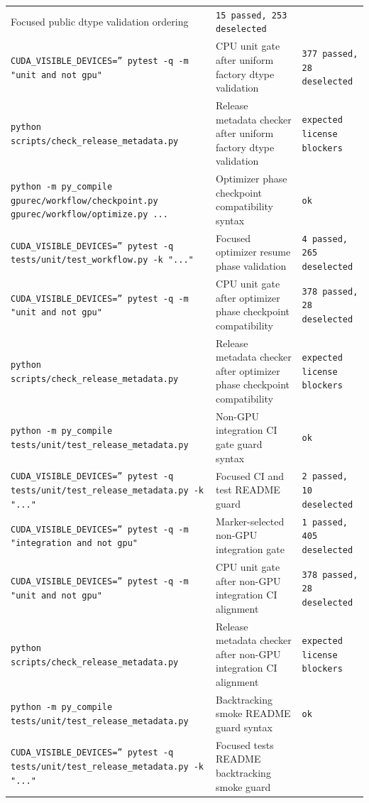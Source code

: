 \documentclass[11pt]{article}
\begin{document}
\begin{center}
\begin{tabular}{lll}
Focused public dtype validation ordering &
\texttt{15 passed, 253 deselected} \\
\texttt{CUDA\_VISIBLE\_DEVICES='' pytest -q -m "unit and not gpu"} &
CPU unit gate after uniform factory dtype validation &
\texttt{377 passed, 28 deselected} \\
\texttt{python scripts/check\_release\_metadata.py} &
Release metadata checker after uniform factory dtype validation &
\texttt{expected license blockers} \\
\texttt{python -m py\_compile gpurec/workflow/checkpoint.py gpurec/workflow/optimize.py ...} &
Optimizer phase checkpoint compatibility syntax &
\texttt{ok} \\
\texttt{CUDA\_VISIBLE\_DEVICES='' pytest -q tests/unit/test\_workflow.py -k "..."} &
Focused optimizer resume phase validation &
\texttt{4 passed, 265 deselected} \\
\texttt{CUDA\_VISIBLE\_DEVICES='' pytest -q -m "unit and not gpu"} &
CPU unit gate after optimizer phase checkpoint compatibility &
\texttt{378 passed, 28 deselected} \\
\texttt{python scripts/check\_release\_metadata.py} &
Release metadata checker after optimizer phase checkpoint compatibility &
\texttt{expected license blockers} \\
\texttt{python -m py\_compile tests/unit/test\_release\_metadata.py} &
Non-GPU integration CI gate guard syntax &
\texttt{ok} \\
\texttt{CUDA\_VISIBLE\_DEVICES='' pytest -q tests/unit/test\_release\_metadata.py -k "..."} &
Focused CI and test README guard &
\texttt{2 passed, 10 deselected} \\
\texttt{CUDA\_VISIBLE\_DEVICES='' pytest -q -m "integration and not gpu"} &
Marker-selected non-GPU integration gate &
\texttt{1 passed, 405 deselected} \\
\texttt{CUDA\_VISIBLE\_DEVICES='' pytest -q -m "unit and not gpu"} &
CPU unit gate after non-GPU integration CI alignment &
\texttt{378 passed, 28 deselected} \\
\texttt{python scripts/check\_release\_metadata.py} &
Release metadata checker after non-GPU integration CI alignment &
\texttt{expected license blockers} \\
\texttt{python -m py\_compile tests/unit/test\_release\_metadata.py} &
Backtracking smoke README guard syntax &
\texttt{ok} \\
\texttt{CUDA\_VISIBLE\_DEVICES='' pytest -q tests/unit/test\_release\_metadata.py -k "..."} &
Focused tests README backtracking smoke guard &

\end{tabular}
\end{center}
\end{document}
